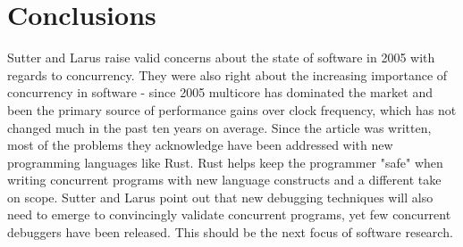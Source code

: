 \documentclass{article}
\begin{document}
\section*{Conclusions}
Sutter and Larus raise valid concerns about the state of software in 2005 with regards to concurrency. They were also right about the increasing importance of concurrency in software - since 2005 multicore has dominated the market and been the primary source of performance gains over clock frequency, which has not changed much in the past ten years on average. Since the article was written, most of the problems they acknowledge have been addressed with new programming languages like
Rust. Rust helps keep the programmer "safe" when writing concurrent programs with new language constructs and a different take on scope. Sutter and Larus point out that new debugging techniques will also need to emerge to convincingly validate concurrent programs, yet few concurrent debuggers have been released. This should be the next focus of software research.




\end{document}
